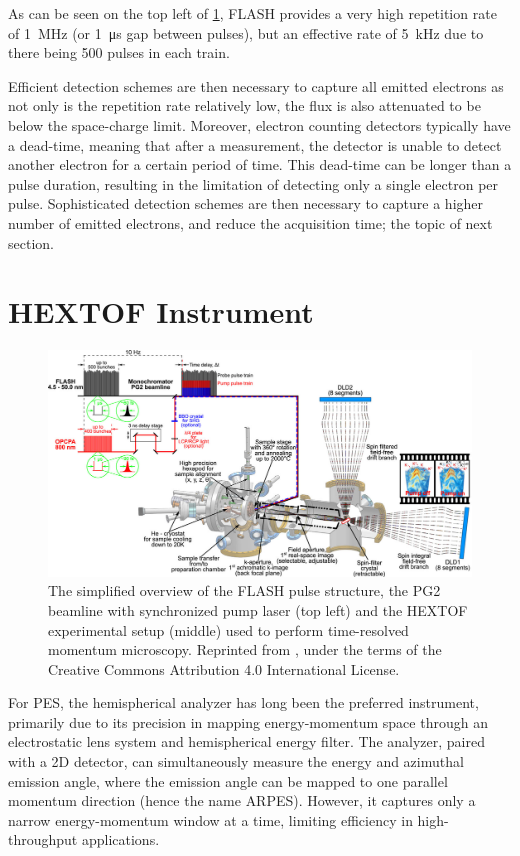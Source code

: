 As can be seen on the top left of \cref{fig:hex-tof}, \gls{FLASH} provides a very high repetition rate of \qty{1}{\mega\hertz} (or \qty{1}{\micro\second} gap between \glspl{pulse}), but an effective rate of \qty{5}{\kilo\hertz} due to there being \num{500} pulses in each \gls{train}. 

Efficient detection schemes are then necessary to capture all emitted electrons as not only is the repetition rate relatively low, the flux is also attenuated to be below the space-charge limit. Moreover, electron counting detectors typically have a dead-time, meaning that after a measurement, the detector is unable to detect another electron for a certain period of time. This dead-time can be longer than a pulse duration, resulting in the limitation of detecting only a single electron per pulse. Sophisticated detection schemes are then necessary to capture a higher number of emitted electrons, and reduce the acquisition time; the topic of next section.

\section{HEXTOF Instrument}

\begin{figure}
    \centering
    \includegraphics[width=1\linewidth]{images/2024-08-27-10-50-01.png}
    \caption{The simplified overview of the \gls{FLASH} pulse structure, the PG2 beamline with synchronized pump laser (top left) and the \gls{HEXTOF} experimental setup (middle) used to perform time-resolved momentum microscopy.
    Reprinted from \cite{kutnyakhovTimeMomentumresolvedPhotoemission2020}, under the terms of the Creative Commons Attribution 4.0 International License.}
    \label{fig:hex-tof}
\end{figure}

For \gls{PES}, the hemispherical analyzer has long been the preferred instrument, primarily due to its precision in mapping energy-momentum space through an electrostatic lens system and hemispherical energy filter. The analyzer, paired with a 2D detector, can simultaneously measure the energy and azimuthal emission angle, where the emission angle can be mapped to one parallel momentum direction (hence the name \gls{ARPES}). However, it captures only a narrow energy-momentum window at a time, limiting efficiency in high-throughput applications.

